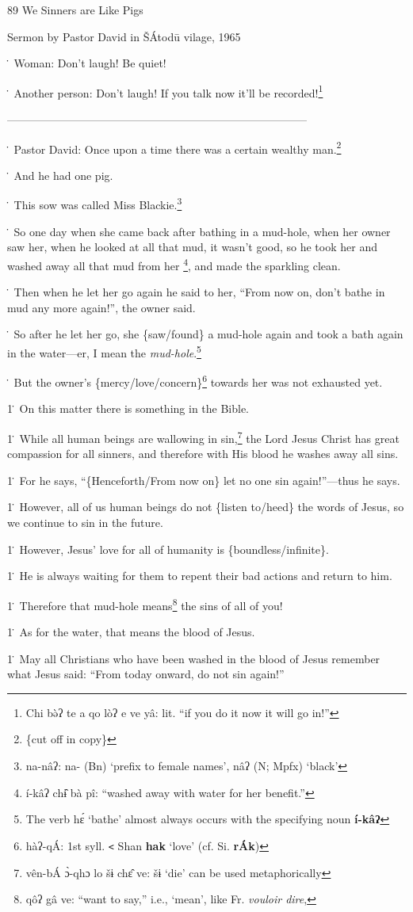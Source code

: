 
89 We Sinners are Like Pigs

Sermon by Pastor David in ŠÁtodū vilage, 1965

\. Woman: Don't laugh! Be quiet!

\. Another person: Don't laugh! If you talk now it'll be recorded!\footnote{Chi bə̀ʔ te a qo lòʔ e ve yâ: lit. ``if you do it now it will go in!''}

---------------------------------------------------------------------------------

\. Pastor David: Once upon a time there was a certain wealthy man.\footnote{\{cut off in copy\}}

\. And he had one pig.

\. This sow was called Miss Blackie.\footnote{na-nâʔ: na- (Bn) `prefix to female names', nâʔ (N; Mpfx) `black'}

\. So one day when she came back after bathing in a mud-hole, when her owner saw
her, when he looked at all that mud, it wasn't good, so he took her and washed
away all that mud from her \footnote{í-kâʔ chɨ̂ bà pî: ``washed away with water for her benefit.''}, and made the sparkling clean.

\. Then when he let her go again he said to her, ``From now on, don't bathe in
mud any more again!'', the owner said.

\. So after he let her go, she \{saw/found\} a mud-hole again and took a bath again
in the water---er, I mean the \textit{mud-hole}.\footnote{The verb hɛ́ `bathe' almost always occurs with the specifying noun \textbf{í-kâʔ}}

\. But the owner's \{mercy/love/concern\}\footnote{hàʔ-qÁ: 1st syll. \texttt{<} Shan \textbf{hak} `love' (cf. Si. \textbf{rÁk})} towards her was not exhausted yet.

1\. On this matter there is something in the Bible.

1\. While all human beings are wallowing in sin,\footnote{vên-bÁ ɔ̀-qhɔ lo šɨ chɛ̂ ve: šɨ `die' can be used metaphorically} the Lord Jesus Christ has great
compassion for all sinners, and therefore with His blood he washes away all sins.

1\. For he says, ``\{Henceforth/From now on\} let no one sin again!''---thus he
says.

1\. However, all of us human beings do not \{listen to/heed\} the words of Jesus,
so we continue to sin in the future.

1\. However, Jesus' love for all of humanity is \{boundless/infinite\}.

1\. He is always waiting for them to repent their bad actions and return to him.

1\. Therefore that mud-hole means\footnote{qôʔ gâ ve: ``want to say,'' i.e., `mean', like Fr. \textit{vouloir dire},} the sins of all of you!

1\. As for the water, that means the blood of Jesus.

1\. May all Christians who have been washed in the blood of Jesus remember what
Jesus said: ``From today onward, do not sin again!''

